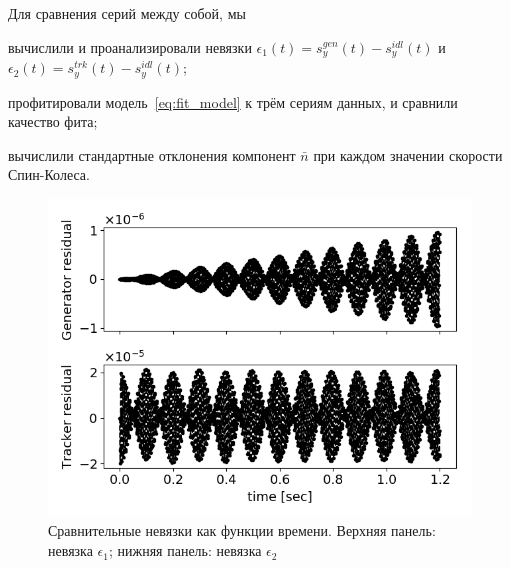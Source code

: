 Для сравнения серий между собой, мы
\begin{enumerate*}
\item вычислили и проанализировали невязки $\epsilon_1(t) = s_y^{gen}(t) -
  s_y^{idl}(t)$ и $\epsilon_2(t) = s_y^{trk}(t) - s_y^{idl}(t)$;
\item профитировали модель~\eqref{eq:fit_model} к трём сериям данных, и
  сравнили качество фита;
\item вычислили стандартные отклонения компонент $\bar n$ при каждом
  значении скорости Спин-Колеса.
\end{enumerate*}

\begin{figure}[h]
	\centering
	\includegraphics[height=.35\paperheight]{images/smp_sim/residual_vs_time(both)}
	\caption{Сравнительные невязки как функции времени.
		Верхняя панель: невязка $\epsilon_1$; нижняя панель: невязка $\epsilon_2$\label{fig:residuals}}
\end{figure}

